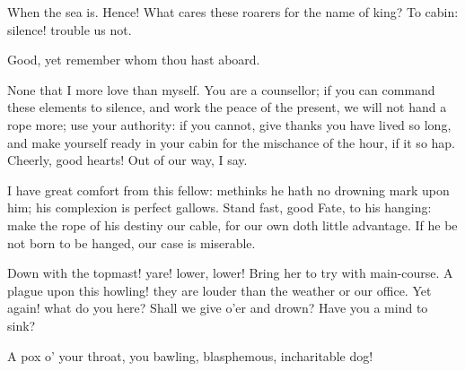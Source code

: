 \begin{prose_speech}[Boatswain] When the sea is. Hence! What cares these roarers for the name of king? To cabin: silence! trouble us not.\end{prose_speech}

\begin{prose_speech}[Gonzalo] Good, yet remember whom thou hast aboard.\end{prose_speech}

\begin{letter}
	\enlargethispage{\baselineskip}
\end{letter}
\begin{prose_speech}[Boatswain] None that I more love than myself. You are a counsellor; if you can command these elements to silence, and work the peace of the present, we will not hand a rope more; use your authority: if you cannot, give thanks you have lived so long, and make yourself ready in your cabin for the mischance of the hour, if it so hap. Cheerly, good hearts! Out of our way, I say.
\end{prose_speech}


\begin{prose_speech}[Gonzalo] I have great comfort from this fellow: methinks he hath no drowning mark upon him; his complexion is perfect gallows. Stand fast, good Fate, to his hanging: make the rope of his destiny our cable, for our own doth little advantage. If he be not born to be hanged, our case is miserable.
\end{prose_speech}




\begin{prose_speech}[Boatswain] Down with the topmast! yare! lower, lower! Bring her to try with main-course.
A plague upon this howling! they are louder than the weather or our office.
Yet again! what do you here? Shall we give o'er and drown? Have you a mind to sink?
\end{prose_speech}

\begin{prose_speech}[Sebastian] A pox o' your throat, you bawling, blasphemous, incharitable dog!
\end{prose_speech}

